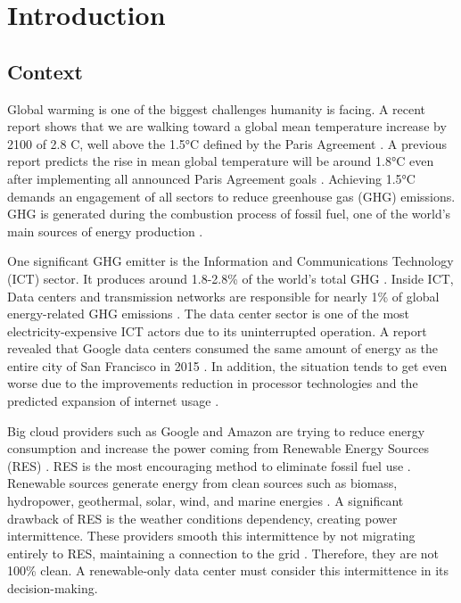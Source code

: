 \chapter{Introduction}
\label{cha:introduction}

\section{Context}

Global warming is one of the biggest challenges humanity is facing. A recent report shows that we are walking toward a global mean temperature increase by 2100 of 2.8 \degree C, well above the 1.5°C defined by the Paris Agreement \cite{lee2023ar6}. A previous report predicts the rise in mean global temperature will be around 1.8°C even after implementing all announced Paris Agreement goals \cite{tracker2022projections}. Achieving 1.5°C demands an engagement of all sectors to reduce greenhouse gas (GHG) emissions. GHG is generated during the combustion process of fossil fuel, one of the world's main sources of energy production \cite{olabi2022renewable}.

One significant GHG emitter is the Information and Communications Technology (ICT) sector. It produces around 1.8-2.8\% of the world's total GHG \cite{freitag2021climate}. Inside ICT, Data centers and transmission networks are responsible for nearly 1\% of global energy-related GHG emissions \cite{centres2022data}. The data center sector is one of the most electricity-expensive ICT actors due to its uninterrupted operation. A report revealed that Google data centers consumed the same amount of energy as the entire city of San Francisco in 2015 \cite{khan2018exploiting}. In addition, the situation tends to get even worse due to the improvements reduction in processor technologies and the predicted expansion of internet usage \cite{cisco2020cisco, freitag2021climate}.

Big cloud providers such as Google and Amazon are trying to reduce energy consumption and increase the power coming from Renewable Energy Sources (RES) \cite{Masanet984}. RES is the most encouraging method to eliminate fossil
fuel use \cite{olabi2022renewable}. Renewable sources generate energy from clean sources such as biomass, hydropower, geothermal, solar, wind, and marine energies \cite{augustine2012renewable, panwar2011role, rostirolla2022survey, UNREnewable, gross2003progress}. A significant drawback of RES is the weather conditions dependency, creating power intermittence. These providers smooth this intermittence by not migrating entirely to RES, maintaining a connection to the grid \cite{rostirolla2022survey}. Therefore, they are not 100\% clean. A renewable-only data center must consider this intermittence in its decision-making. 

